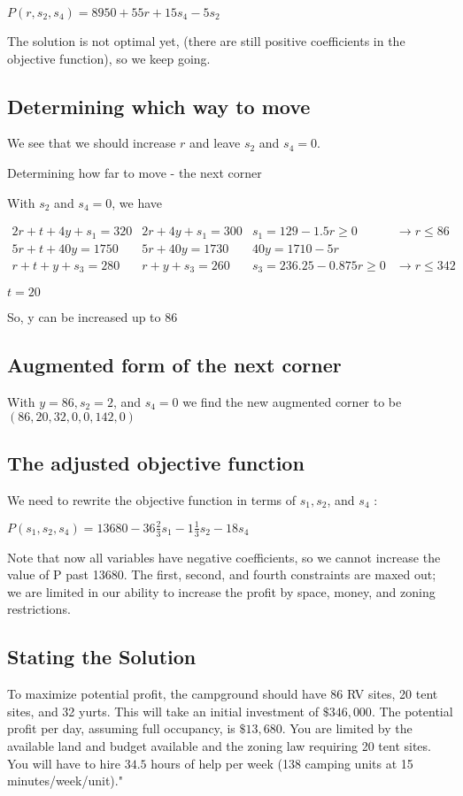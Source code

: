 $P\left(r, s_{2}, s_{4}\right)=8950+55 r+15 s_{4}-5 s_{2}$

The solution is not optimal yet, (there are still positive coefficients in the objective function), so we keep going.

\subsection{Determining which way to move}
We see that we should increase $r$ and leave $s_{2}$ and $s_{4}=0$.

Determining how far to move - the next corner

With $s_{2}$ and $s_{4}=0$, we have

$\begin{array}{llll}2 r+t+4 y+s_{1}=320 & 2 r+4 y+s_{1}=300 & s_{1}=129-1.5 r \geq 0 & \rightarrow r \leq 86 \\ 5 r+t+40 y=1750 & 5 r+40 y=1730 & 40 y=1710-5 r & \\ r+t+y+s_{3}=280 & r+y+s_{3}=260 & s_{3}=236.25-0.875 r \geq 0 & \rightarrow r \leq 342\end{array}$

$t=20$

So, y can be increased up to 86

\subsection{Augmented form of the next corner}
With $y=86, s_{2}=2$, and $s_{4}=0$ we find the new augmented corner to be $(86,20,32,0,0,142,0)$

\subsection{The adjusted objective function}
We need to rewrite the objective function in terms of $s_{1}, s_{2}$, and $s_{4}$ :

$P\left(s_{1}, s_{2}, s_{4}\right)=13680-36 \frac{2}{3} s_{1}-1 \frac{1}{3} s_{2}-18 s_{4}$

Note that now all variables have negative coefficients, so we cannot increase the value of P past 13680. The first, second, and fourth constraints are maxed out; we are limited in our ability to increase the profit by space, money, and zoning restrictions.

\subsection{ Stating the Solution }
To maximize potential profit, the campground should have 86 RV sites, 20 tent sites, and 32 yurts. This will take an initial investment of $\$ 346,000$. The potential profit per day, assuming full occupancy, is $\$ 13,680$. You are limited by the available land and budget available and the zoning law requiring 20 tent sites. You will have to hire $34.5$ hours of help per week (138 camping units at 15 minutes/week/unit)."

